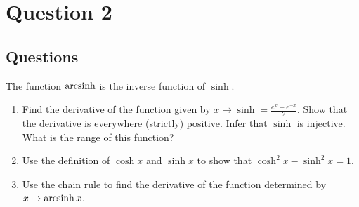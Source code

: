 \chapter{Question 2}
\section{Questions}
The function $\operatorname{arcsinh}$ is the inverse function of $\sinh$.

\begin{enumerate}
  \item Find the derivative of the function given by
  $x \mapsto \sinh = \frac{e^x - e^{-x}}{2}$. Show that the derivative is
  everywhere (strictly) positive. Infer that $\sinh$ is injective. What is the
  range of this function?
  \item Use the definition of $\cosh x$ and $\sinh x$ to show that
  $\cosh^2 x - \sinh^2 x = 1$.
  \item Use the chain rule to find the derivative of the function determined by
  $x \mapsto \operatorname{arcsinh} x$.
\end{enumerate}


